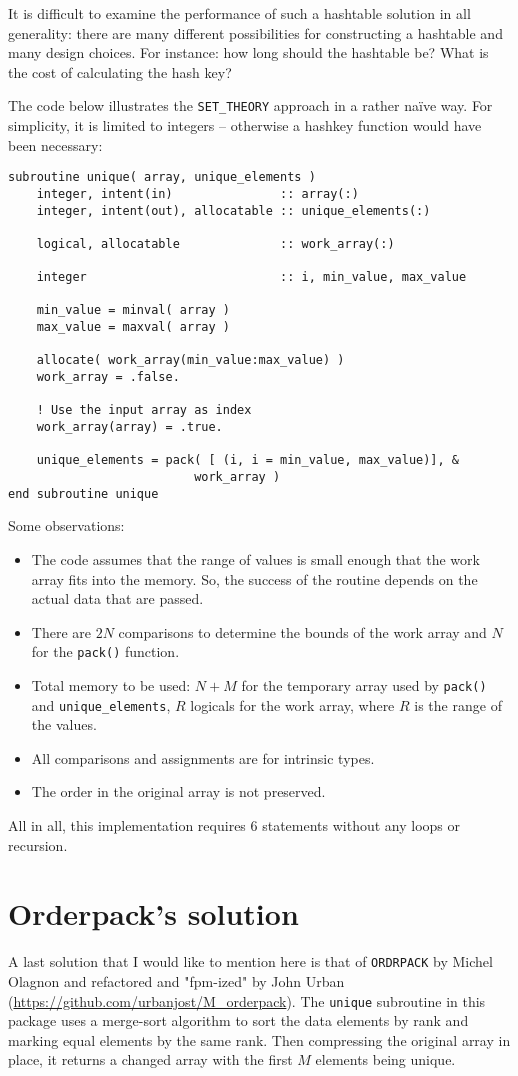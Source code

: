 \documentclass[onecolumn]{article}
\begin{document}
It is difficult to examine the performance of such a hashtable solution in all generality: there are many different
possibilities for constructing a hashtable and many design choices. For instance: how long should the hashtable
be? What is the cost of calculating the hash key?

The code below illustrates the \verb+SET_THEORY+ approach in a rather na\"ive way. For simplicity, it is limited
to integers -- otherwise a hashkey function would have been necessary:
%
\begin{verbatim}
subroutine unique( array, unique_elements )
    integer, intent(in)               :: array(:)
    integer, intent(out), allocatable :: unique_elements(:)

    logical, allocatable              :: work_array(:)

    integer                           :: i, min_value, max_value

    min_value = minval( array )
    max_value = maxval( array )

    allocate( work_array(min_value:max_value) )
    work_array = .false.

    ! Use the input array as index
    work_array(array) = .true.

    unique_elements = pack( [ (i, i = min_value, max_value)], &
                          work_array )
end subroutine unique
\end{verbatim}
%
Some observations:
\begin{itemize}
\item
The code assumes that the range of values is small enough that the work array fits into the memory.
So, the success of the routine depends on the actual data that are passed.
\item
There are $2N$ comparisons to determine the bounds of the work array and $N$ for the \verb+pack()+ function.
\item
Total memory to be used: $N+M$ for the temporary array used by \verb+pack()+ and \verb+unique_elements+,
$R$ logicals for the work array, where $R$ is the range of the values.
\item
All comparisons and assignments are for intrinsic types.
\item
The order in the original array is not preserved.
\end{itemize}

All in all, this implementation requires 6 statements without any loops or recursion.


\section*{Orderpack's solution}
A last solution that I would like to mention here is that of \verb+ORDRPACK+ by Michel Olagnon
and refactored and "fpm-ized" by John Urban (\url{https://github.com/urbanjost/M_orderpack}).
The \verb+unique+ subroutine in this package uses a merge-sort algorithm to sort the data
elements by rank and marking equal elements by the same rank. Then compressing the original
array in place, it returns a changed array with the first $M$ elements being unique.
\end{document}

